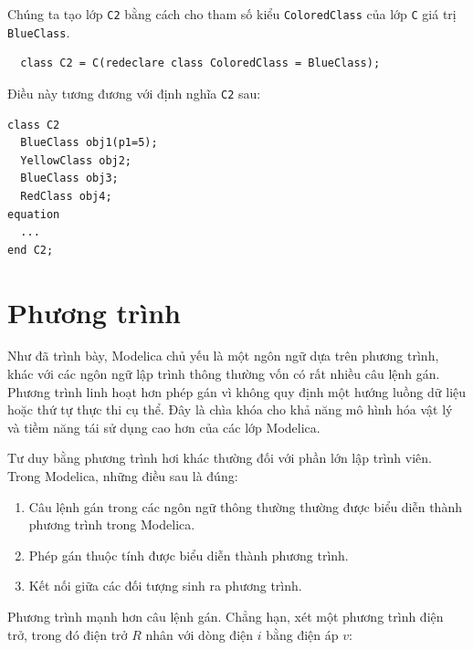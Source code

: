 Chúng ta tạo lớp \texttt{C2} bằng cách cho tham số kiểu \texttt{ColoredClass} của lớp \texttt{C} giá trị \texttt{BlueClass}.
\begin{verbatim}
  class C2 = C(redeclare class ColoredClass = BlueClass);
\end{verbatim}
Điều này tương đương với định nghĩa \texttt{C2} sau:
\begin{verbatim}
class C2
  BlueClass obj1(p1=5);
  YellowClass obj2;
  BlueClass obj3;
  RedClass obj4;
equation
  ...
end C2;
\end{verbatim}

\section{Phương trình}
Như đã trình bày, Modelica chủ yếu là một ngôn ngữ dựa trên phương trình, khác với các ngôn ngữ lập trình thông thường vốn có rất nhiều câu lệnh gán. Phương trình linh hoạt hơn phép gán vì không quy định một hướng luồng dữ liệu hoặc thứ tự thực thi cụ thể. Đây là chìa khóa cho khả năng mô hình hóa vật lý và tiềm năng tái sử dụng cao hơn của các lớp Modelica.

Tư duy bằng phương trình hơi khác thường đối với phần lớn lập trình viên. Trong Modelica, những điều sau là đúng:
\begin{enumerate}
\item Câu lệnh gán trong các ngôn ngữ thông thường thường được biểu diễn thành phương trình trong Modelica.
\item Phép gán thuộc tính được biểu diễn thành phương trình.
\item Kết nối giữa các đối tượng sinh ra phương trình.
\end{enumerate}
Phương trình mạnh hơn câu lệnh gán. Chẳng hạn, xét một phương trình điện trở, trong đó điện trở $R$ nhân với dòng điện $i$ bằng điện áp $v$:

